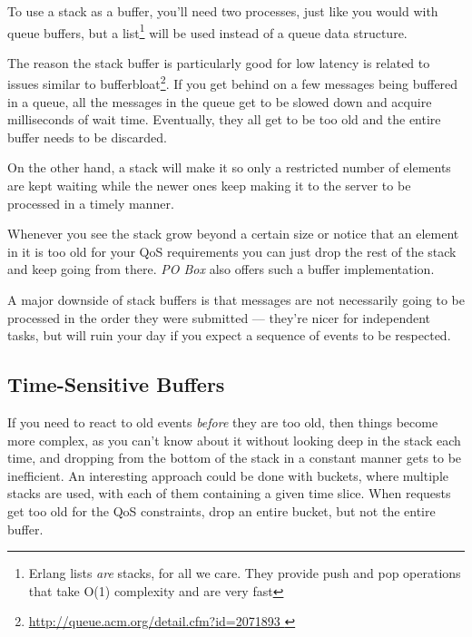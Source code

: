 To use a stack as a buffer, you'll need two processes, just like you would with queue buffers, but a list\footnote{Erlang lists \emph{are} stacks, for all we care. They provide push and pop operations that take O(1) complexity and are very fast} will be used instead of a queue data structure.

The reason the stack buffer is particularly good for low latency is related to issues similar to bufferbloat\footnote{\href{http://queue.acm.org/detail.cfm?id=2071893}{http://queue.acm.org/detail.cfm?id=2071893 }}. If you get behind on a few messages being buffered in a queue, all the messages in the queue get to be slowed down and acquire milliseconds of wait time. Eventually, they all get to be too old and the entire buffer needs to be discarded.


On the other hand, a stack will make it so only a restricted number of elements are kept waiting while the newer ones keep making it to the server to be processed in a timely manner.


Whenever you see the stack grow beyond a certain size or notice that an element in it is too old for your QoS requirements you can just drop the rest of the stack and keep going from there. \emph{PO Box} also offers such a buffer implementation.

A major downside of stack buffers is that messages are not necessarily going to be processed in the order they were submitted — they're nicer for independent tasks, but will ruin your day if you expect a sequence of events to be respected.

\subsection{Time-Sensitive Buffers}

If you need to react to old events \emph{before} they are too old, then things become more complex, as you can't know about it without looking deep in the stack each time, and dropping from the bottom of the stack in a constant manner gets to be inefficient. An interesting approach could be done with buckets, where multiple stacks are used, with each of them containing a given time slice. When requests get too old for the QoS constraints, drop an entire bucket, but not the entire buffer.

